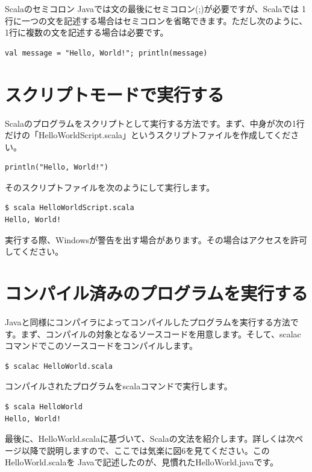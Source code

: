\documentclass[10pt]{jarticle}
\begin{document}
\begin{itembox}[l]{Scalaのセミコロン}
Javaでは文の最後にセミコロン(;)が必要ですが、Scalaでは 1行に一つの文を記述する場合はセミコロンを省略できます。ただし次のように、1行に複数の文を記述する場合は必要です。
\begin{verbatim}
val message = "Hello, World!"; println(message)
\end{verbatim}
\end{itembox}

\section{スクリプトモードで実行する}
Scalaのプログラムをスクリプトとして実行する方法です。まず、中身が次の1行だけの「HelloWorldScript.scala」というスクリプトファイルを作成してください。
\begin{lstlisting}
println("Hello, World!")
\end{lstlisting}
そのスクリプトファイルを次のようにして実行します。
\begin{verbatim}
$ scala HelloWorldScript.scala
Hello, World!
\end{verbatim}
実行する際、Windowsが警告を出す場合があります。その場合はアクセスを許可してください。 
\section{コンパイル済みのプログラムを実行する}
Javaと同様にコンパイラによってコンパイルしたプログラムを実行する方法です。まず、コンパイルの対象となるソースコードを用意します。そして、scalacコマンドでこのソースコードをコンパイルします。
\begin{verbatim}
$ scalac HelloWorld.scala
\end{verbatim}
コンパイルされたプログラムをscalaコマンドで実行します。
\begin{verbatim}
$ scala HelloWorld
Hello, World!
\end{verbatim}
最後に、HelloWorld.scalaに基づいて、Scalaの文法を紹介します。詳しくは次ページ以降で説明しますので、ここでは気楽に図6を見てください。このHelloWorld.scalaを Javaで記述したのが、見慣れたHelloWorld.javaです。
\end{document}
